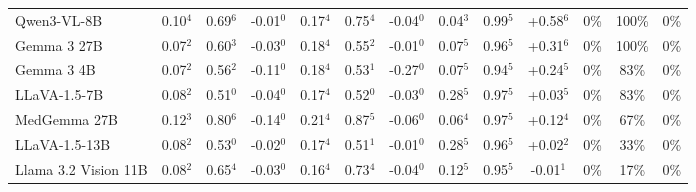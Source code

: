 \begin{table}[t]
\begin{tabular}{l@{\hspace{3pt}}ccc@{\hspace{4pt}}ccc@{\hspace{4pt}}ccc@{\hspace{4pt}}ccc}
Qwen3-VL-8B & \cellcolor{cfSage2}0.10$^{4}$ & \cellcolor{cfSage2}0.69$^{6}$ & \cellcolor{cfTerra1}-0.01$^{0}$ & \cellcolor{cfSage3}0.17$^{4}$ & \cellcolor{cfSage2}0.75$^{4}$ & \cellcolor{cfTerra2}-0.04$^{0}$ & \cellcolor{cfSage1}0.04$^{3}$ & \cellcolor{cfSage4}0.99$^{5}$ & \cellcolor{cfSlate4}+0.58$^{6}$ & \cellcolor{cfSlate1}0\% & \cellcolor{cfSlate4}100\% & 0\% \\
Gemma 3 27B & \cellcolor{cfSage2}0.07$^{2}$ & \cellcolor{cfSage2}0.60$^{3}$ & \cellcolor{cfTerra2}-0.03$^{0}$ & \cellcolor{cfSage3}0.18$^{4}$ & \cellcolor{cfSage1}0.55$^{2}$ & \cellcolor{cfTerra1}-0.01$^{0}$ & \cellcolor{cfSage2}0.07$^{5}$ & \cellcolor{cfSage4}0.96$^{5}$ & \cellcolor{cfSlate4}+0.31$^{6}$ & \cellcolor{cfSlate1}0\% & \cellcolor{cfSlate4}100\% & 0\% \\
Gemma 3 4B & \cellcolor{cfSage2}0.07$^{2}$ & \cellcolor{cfSage1}0.56$^{2}$ & \cellcolor{cfTerra3}-0.11$^{0}$ & \cellcolor{cfSage3}0.18$^{4}$ & \cellcolor{cfSage1}0.53$^{1}$ & \cellcolor{cfTerra4}-0.27$^{0}$ & \cellcolor{cfSage2}0.07$^{5}$ & \cellcolor{cfSage4}0.94$^{5}$ & \cellcolor{cfSlate3}+0.24$^{5}$ & \cellcolor{cfSlate1}0\% & \cellcolor{cfSlate3}83\% & 0\% \\
LLaVA-1.5-7B & \cellcolor{cfSage2}0.08$^{2}$ & \cellcolor{cfSage1}0.51$^{0}$ & \cellcolor{cfTerra2}-0.04$^{0}$ & \cellcolor{cfSage3}0.17$^{4}$ & \cellcolor{cfSage1}0.52$^{0}$ & \cellcolor{cfTerra2}-0.03$^{0}$ & \cellcolor{cfSage4}0.28$^{5}$ & \cellcolor{cfSage4}0.97$^{5}$ & \cellcolor{cfSlate2}+0.03$^{5}$ & \cellcolor{cfSlate1}0\% & \cellcolor{cfSlate3}83\% & 0\% \\
MedGemma 27B & \cellcolor{cfSage3}0.12$^{3}$ & \cellcolor{cfSage3}0.80$^{6}$ & \cellcolor{cfTerra3}-0.14$^{0}$ & \cellcolor{cfSage4}0.21$^{4}$ & \cellcolor{cfSage3}0.87$^{5}$ & \cellcolor{cfTerra2}-0.06$^{0}$ & \cellcolor{cfSage2}0.06$^{4}$ & \cellcolor{cfSage4}0.97$^{5}$ & \cellcolor{cfSlate3}+0.12$^{4}$ & \cellcolor{cfSlate1}0\% & \cellcolor{cfSlate3}67\% & 0\% \\
LLaVA-1.5-13B & \cellcolor{cfSage2}0.08$^{2}$ & \cellcolor{cfSage1}0.53$^{0}$ & \cellcolor{cfTerra2}-0.02$^{0}$ & \cellcolor{cfSage3}0.17$^{4}$ & \cellcolor{cfSage1}0.51$^{1}$ & \cellcolor{cfTerra1}-0.01$^{0}$ & \cellcolor{cfSage4}0.28$^{5}$ & \cellcolor{cfSage4}0.96$^{5}$ & \cellcolor{cfSlate2}+0.02$^{2}$ & \cellcolor{cfSlate1}0\% & \cellcolor{cfSlate2}33\% & 0\% \\
Llama 3.2 Vision 11B & \cellcolor{cfSage2}0.08$^{2}$ & \cellcolor{cfSage2}0.65$^{4}$ & \cellcolor{cfTerra2}-0.03$^{0}$ & \cellcolor{cfSage3}0.16$^{4}$ & \cellcolor{cfSage2}0.73$^{4}$ & \cellcolor{cfTerra2}-0.04$^{0}$ & \cellcolor{cfSage3}0.12$^{5}$ & \cellcolor{cfSage4}0.95$^{5}$ & \cellcolor{cfTerra1}-0.01$^{1}$ & \cellcolor{cfSlate1}0\% & \cellcolor{cfSlate2}17\% & 0\% \\

\end{tabular}
\end{table}
